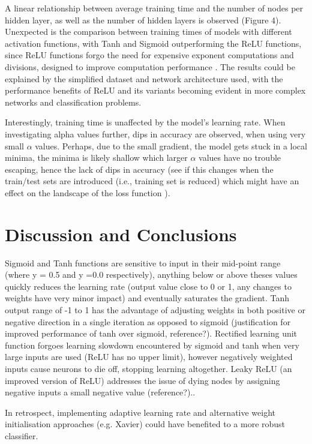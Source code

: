 \documentclass{article}
\begin{document}
A linear relationship between average training time and the number of nodes per hidden layer, as well as the number of hidden layers is observed (Figure 4). Unexpected is the comparison between training times of models with different activation functions, with Tanh and Sigmoid outperforming the ReLU functions, since ReLU functions forgo the need for expensive exponent computations and divisions, designed to improve computation performance \cite{Niwa}. The results could be explained by the simplified dataset and network architecture used, with the performance benefits of ReLU and its variants becoming evident in more complex networks and classification problems.

Interestingly, training time is unaffected by the model's learning rate. When investigating alpha values further, dips in accuracy are observed, when using very small $\alpha$ values. Perhaps, due to the small gradient, the model gets stuck in a local minima, the minima is likely shallow which larger $\alpha$ values have no trouble escaping, hence the lack of dips in accuracy (see if this changes when the train/test sets are introduced (i.e., training set is reduced) which might have an effect on the landscape of the loss function \cite{Guo}). 

\section{Discussion and Conclusions}
Sigmoid and Tanh functions are sensitive to input in their mid-point range (where y = 0.5 and y =0.0 respectively), anything below or above theses values quickly reduces the learning rate (output value close to 0 or 1, any changes to weights have very minor impact) and eventually saturates the gradient.
Tanh output range of -1 to 1 has the advantage of adjusting weights in both positive or negative direction in a single iteration as opposed to sigmoid (justification for improved performance of tanh over sigmoid, reference?).
Rectified learning unit function forgoes learning slowdown encountered by sigmoid and tanh when very large inputs are used (ReLU has no upper limit), however negatively weighted inputs cause neurons to die off, stopping learning altogether. Leaky ReLU (an improved version of ReLU) addresses the issue of dying nodes by assigning negative inputs a small negative value (reference?)..

In retrospect, implementing adaptive learning rate and alternative weight initialisation approaches (e.g. Xavier) could have benefited to a more robust classifier.
\end{document}
